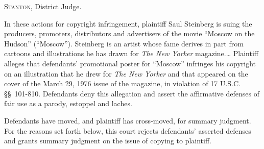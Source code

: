 

\opinion \textsc{Stanton}, District Judge.

In these actions for copyright infringement, plaintiff Saul Steinberg is suing
the producers, promoters, distributors and advertisers of the movie ``Moscow on
the Hudson'' (``Moscow''). Steinberg is an artist whose fame derives in part
from cartoons and illustrations he has drawn for \textit{The New Yorker}
magazine.\ldots
%
%
Plaintiff alleges that defendants' promotional poster for ``Moscow'' infringes
his copyright on an illustration that he drew  for \textit{The New Yorker} and
that appeared on the cover of the March 29, 1976 issue of the magazine, in
violation of 17 U.S.C. \S\S~101-810. Defendants deny this allegation and assert
the affirmative defenses of fair use as a parody, estoppel and laches.

Defendants have moved, and plaintiff has cross-moved, for summary judgment. For
the reasons set forth below, this court rejects defendants' asserted defenses
and grants summary judgment on the issue of copying to plaintiff.



